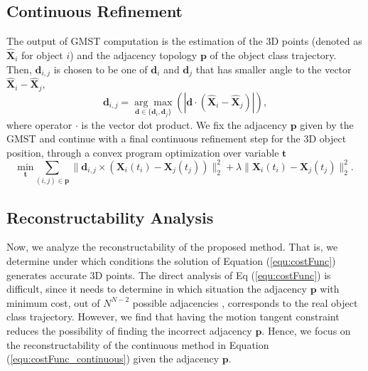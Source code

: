 \subsection{Continuous Refinement}
The output of GMST computation is the estimation of the 3D points (denoted as $\mathbf{\widehat{X}}_i$ for object $i$) and the adjacency topology $\mathbf{p}$ of the object class trajectory. Then, $\mathbf{d}_{i,j}$ is chosen to be one of $\mathbf{d}_i$ and $\mathbf{d}_j$  that has smaller angle to the vector $\mathbf{\hat{X}}_i - \mathbf{\hat{X}}_j$,
\begin{equation}
\mathbf{d}_{i,j}= \underset{\mathbf{d}\in{\{\mathbf{d}_i, \mathbf{d}_j}\} }{\arg\!\max}(|\mathbf{d} \cdot (\mathbf{\hat{X}}_i - \mathbf{\hat{X}}_j)| ),
\end{equation}
where operator $\cdot$ is the vector dot product.
We fix the adjacency $\mathbf{p}$ given by the GMST and continue with a final continuous refinement step for the 3D object position, through a convex program optimization over variable $\mathbf{t}$
\begin{equation}
\underset{\mathbf{t}} { \text{min} }
\sum_{(i,j)\in{\mathbf{p}}}{\|\mathbf{d}_{i,j}\times(\mathbf{X}_i(t_i)-\mathbf{X}_j(t_j))\|_2^2 + \lambda\|\mathbf{X}_i(t_i)-\mathbf{X}_j(t_j)\|_2^2}.
\label{equ:costFunc_continuous}
\end{equation}

\subsection{Reconstructability Analysis} \label{sec:analysis}

Now, we analyze the reconstructability of the proposed method. That is, we determine under which conditions the solution of Equation (\ref{equ:costFunc}) generates accurate 3D points. The direct analysis of Eq (\ref{equ:costFunc}) is difficult, since it needs to determine in which situation the adjacency $\mathbf{p}$ with minimum cost, out of $N^{N-2}$ possible adjacencies \cite{wiki_cayley_alg}, corresponds to the real object class trajectory.
However, we find that having the motion tangent constraint reduces the possibility of finding the incorrect adjacency $\mathbf{p}$. 
Hence, we focus on  the reconstructability of the continuous method in Equation (\ref{equ:costFunc_continuous}) given the adjacency $\mathbf{p}$.

